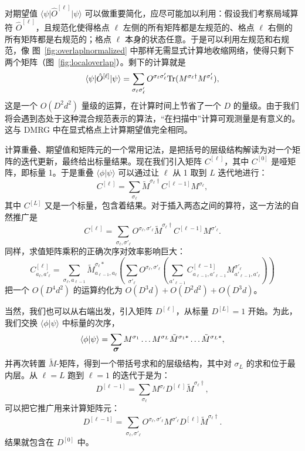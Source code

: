 \documentclass[a4paper,10pt,oneside,onecolumn,1p,times]{elsarticle}
\newcommand{\tr}{{\rm Tr }}
\newcommand{\bra}[1]{\mbox{$\langle #1  |$}}
\newcommand{\ket}[1]{\mbox{$| #1  \rangle$}}
\newcommand{\braket}[2]{\mbox{$\langle #1  | #2 \rangle$}} 	%
\newcommand{\fat}[1]{\mbox{\boldmath$#1$\unboldmath}}	%
\begin{document}
对期望值 $\bra{\psi} \hat{O}^{[\ell]} \ket{\psi}$ 可以做重要简化，应尽可能加以利用：假设我们考察局域算符 $\hat{O}^{[\ell]}$，且规范化使得格点 $\ell$ 左侧的所有矩阵都是左规范的、格点 $\ell$ 右侧的所有矩阵都是右规范的；格点 $\ell$ 本身的状态任意。于是可以利用左规范和右规范，像 图~\ref{fig:overlaplnormalized} 中那样无需显式计算地收缩网络，使得只剩下两个矩阵（图~\ref{fig:localoverlap}）。剩下的计算就是
\begin{equation}
\bra{\psi} \hat{O}^{[\ell]} \ket{\psi} = \sum_{\sigma_\ell \sigma'_\ell} O^{\sigma_\ell \sigma'_\ell} \tr
(M^{\sigma_\ell \dagger} M^{\sigma'_\ell}),
\end{equation} 
这是一个 $O(D^2 d^2)$ 量级的运算，在计算时间上节省了一个 $D$ 的量级。由于我们将会遇到态处于这种混合规范表示的算法，“在扫描中”计算可观测量是有意义的。这与 DMRG 中在显式格点上计算期望值完全相同。
    
计算重叠、期望值和矩阵元的一个常用记法，是把括号的层级结构解读为对一个矩阵的迭代更新，最终给出标量结果。现在我们引入矩阵 $C^{[\ell]}$，其中 $C^{[0]}$ 是哑矩阵，即标量 1。于是重叠 $\braket{\phi}{\psi}$ 可以通过让 $\ell$ 从 1 取到 $L$ 迭代地进行：
\begin{equation}
C^{[\ell]} = \sum_{\sigma_\ell} \tilde{M}^{\sigma_{\ell}\dagger} C^{[\ell-1]} M^{\sigma_{\ell}} ,
\end{equation}
其中 $C^{[L]}$ 又是一个标量，包含着结果。对于插入两态之间的算符，这一方法的自然推广是
\begin{equation}
C^{[\ell]} = \sum_{\sigma_\ell,\sigma'_\ell} O^{\sigma_\ell,\sigma'_\ell} \tilde{M}^{\sigma_{\ell}\dagger} C^{[\ell-1]} M^{\sigma'_{\ell}} .
\end{equation}
同样，求值矩阵乘积的正确次序对效率影响巨大：
\begin{equation}
C^{[\ell]}_{a_\ell,a'_\ell} = \sum_{\sigma_\ell,a_{\ell-1}}  \tilde{M}^{\sigma_{\ell}*}_{a_{\ell-1},a_\ell} \left( \sum_{\sigma'_\ell} O^{\sigma_\ell,\sigma'_\ell} 
\left( \sum_{a'_{\ell-1}} C^{[\ell-1]}_{a_{\ell-1},a'_{\ell-1}} 
M^{\sigma'_{\ell}}_{a'_{\ell-1},a'_\ell} \right) \right) 
\end{equation}
把一个 $O(D^4 d^2)$ 的运算约化为 $O(D^3 d) + O(D^2d^2) + O(D^3 d)$。

当然，我们也可以从右端出发，引入矩阵 $D^{[\ell]}$，从标量
$D^{[L]}=1$ 开始。为此，我们交换 $\braket{\phi}{\psi}$ 中标量的次序，
\begin{equation}
\braket{\phi}{\psi} = \sum_{\fat{\sigma}}M^{\sigma_1} \ldots M^{\sigma_L}  \tilde{M}^{\sigma_1*} \ldots \tilde{M}^{\sigma_L*}  ,
\end{equation}
并再次转置 $\tilde{M}$-矩阵，得到一个带括号求和的层级结构，其中对 $\sigma_L$ 的求和位于最内层。从 $\ell=L$ 跑到 $\ell=1$ 的迭代于是为：
\begin{equation}
D^{[\ell-1]} = \sum_{\sigma_\ell}  M^{\sigma_{\ell}} D^{[\ell]} \tilde{M}^{\sigma_{\ell}\dagger} ,
\end{equation}
可以把它推广用来计算矩阵元：
\begin{equation}
D^{[\ell-1]} = \sum_{\sigma_\ell,\sigma'_\ell}  O^{\sigma_\ell,\sigma'_\ell} M^{\sigma'_{\ell}} D^{[\ell]} \tilde{M}^{\sigma_{\ell}\dagger} .
\end{equation}
结果就包含在 $D^{[0]}$ 中。
\end{document}
